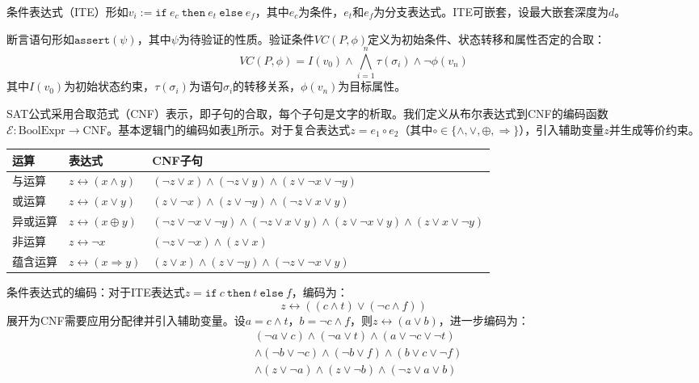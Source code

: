 条件表达式（ITE）形如$v_i := \texttt{if}\ e_c\ \texttt{then}\ e_t\ \texttt{else}\ e_f$，其中$e_c$为条件，$e_t$和$e_f$为分支表达式。ITE可嵌套，设最大嵌套深度为$d$。

断言语句形如$\texttt{assert}(\psi)$，其中$\psi$为待验证的性质。验证条件$VC(P, \phi)$定义为初始条件、状态转移和属性否定的合取：
$$VC(P, \phi) = I(v_0) \wedge \bigwedge_{i=1}^{n} \tau(\sigma_i) \wedge \neg\phi(v_n)$$
其中$I(v_0)$为初始状态约束，$\tau(\sigma_i)$为语句$\sigma_i$的转移关系，$\phi(v_n)$为目标属性。

SAT公式采用合取范式（CNF）表示，即子句的合取，每个子句是文字的析取。我们定义从布尔表达式到CNF的编码函数$\mathcal{E}: \text{BoolExpr} \rightarrow \text{CNF}$。基本逻辑门的编码如表\ref{tab:logic-encoding}所示。对于复合表达式$z = e_1 \circ e_2$（其中$\circ \in \{\wedge, \vee, \oplus, \Rightarrow\}$），引入辅助变量$z$并生成等价约束。

\begin{table}[htbp]
\centering
{}
\label{tab:logic-encoding}
\begin{tabular}{llp{7cm}}
\toprule
\textbf{运算} & \textbf{表达式} & \textbf{CNF子句} \\
\midrule
与运算 & $z \leftrightarrow (x \wedge y)$ & $(\neg z \vee x) \wedge (\neg z \vee y) \wedge (z \vee \neg x \vee \neg y)$ \\
或运算 & $z \leftrightarrow (x \vee y)$ & $(z \vee \neg x) \wedge (z \vee \neg y) \wedge (\neg z \vee x \vee y)$ \\
异或运算 & $z \leftrightarrow (x \oplus y)$ & $(\neg z \vee \neg x \vee \neg y) \wedge (\neg z \vee x \vee y) \wedge (z \vee \neg x \vee y) \wedge (z \vee x \vee \neg y)$ \\
非运算 & $z \leftrightarrow \neg x$ & $(\neg z \vee \neg x) \wedge (z \vee x)$ \\
蕴含运算 & $z \leftrightarrow (x \Rightarrow y)$ & $(z \vee x) \wedge (z \vee \neg y) \wedge (\neg z \vee \neg x \vee y)$ \\
\bottomrule
\end{tabular}
\end{table}

条件表达式的编码：对于ITE表达式$z = \texttt{if}\ c\ \texttt{then}\ t\ \texttt{else}\ f$，编码为：
$$z \leftrightarrow ((c \wedge t) \vee (\neg c \wedge f))$$
展开为CNF需要应用分配律并引入辅助变量。设$a = c \wedge t$，$b = \neg c \wedge f$，则$z \leftrightarrow (a \vee b)$，进一步编码为：
\begin{align*}
&(\neg a \vee c) \wedge (\neg a \vee t) \wedge (a \vee \neg c \vee \neg t) \\
&\wedge (\neg b \vee \neg c) \wedge (\neg b \vee f) \wedge (b \vee c \vee \neg f) \\
&\wedge (z \vee \neg a) \wedge (z \vee \neg b) \wedge (\neg z \vee a \vee b)
\end{align*}

